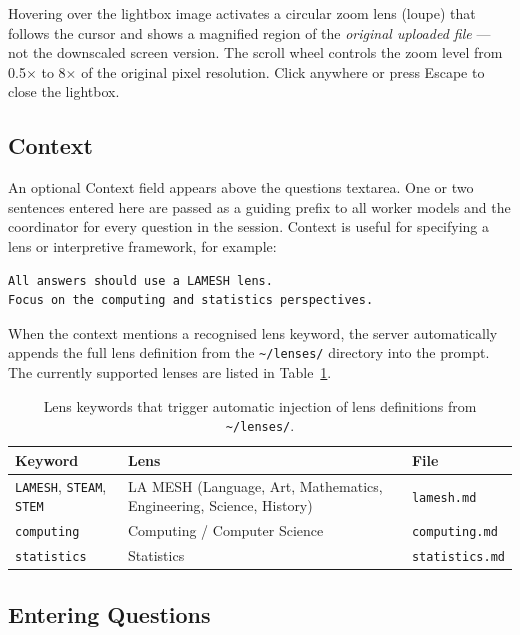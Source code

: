 \documentclass[11pt]{article}
\begin{document}
Hovering over the lightbox image activates a circular zoom lens (loupe)
that follows the cursor and shows a magnified region of the \emph{original
uploaded file} --- not the downscaled screen version. The scroll wheel
controls the zoom level from 0.5$\times$ to 8$\times$ of the original
pixel resolution. Click anywhere or press \textsf{Escape} to close the
lightbox.

\subsection{Context}

An optional \textsf{Context} field appears above the questions textarea.
One or two sentences entered here are passed as a guiding prefix to all
worker models and the coordinator for every question in the session.
Context is useful for specifying a lens or interpretive framework, for
example:

\begin{Verbatim}[fontsize=\small]
All answers should use a LAMESH lens.
Focus on the computing and statistics perspectives.
\end{Verbatim}

When the context mentions a recognised lens keyword, the server
automatically appends the full lens definition from the \texttt{\textasciitilde/lenses/}
directory into the prompt. The currently supported lenses are listed in
Table~\ref{tab:lenses}.

\begin{table}[h]
\centering
\begin{tabular}{lll}
\toprule
\textbf{Keyword} & \textbf{Lens} & \textbf{File} \\
\midrule
\texttt{LAMESH}, \texttt{STEAM}, \texttt{STEM} & LA MESH (Language, Art, Mathematics, Engineering, Science, History) & \texttt{lamesh.md} \\
\texttt{computing} & Computing / Computer Science & \texttt{computing.md} \\
\texttt{statistics} & Statistics & \texttt{statistics.md} \\
\bottomrule
\end{tabular}
\caption{Lens keywords that trigger automatic injection of lens definitions from \texttt{\textasciitilde/lenses/}.}
\label{tab:lenses}
\end{table}

\subsection{Entering Questions}
\end{document}
